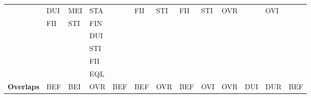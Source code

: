 \documentclass[11pt]{report}
\newenvironment{vvarmargin}[2]
{
  \begin{list}{}
  {
    \setlength{\topsep}{0pt}
    \setlength{\leftmargin}{0pt}
    \setlength{\rightmargin}{0pt}
    \setlength{\listparindent}{\parindent}
    \setlength{\itemindent}{\parindent}
    \setlength{\parsep}{0pt plus 1pt}
    \addtolength{\leftmargin}{#1}\addtolength{\rightmargin}{#2}
  }
  \item
}
{
  \end{list}
}
\begin{document}
\begin{table}[p]
\begin{vvarmargin}{-4cm}{-4cm}
\begin{center}
\begin{tabular}[t]{|r|l|l|l|l|l|l|l|l|l|l|l|l|}
                                          & DUI                     & MEI                     & STA                     &                         & FII                     & STI                     & FII                     & STI                     & OVR                     &                         & OVI                     &                         \\
                                          & FII                     & STI                     & FIN                     &                         &                         &                         &                         &                         &                         &                         &                         &                         \\
                                          &                         &                         & DUI                     &                         &                         &                         &                         &                         &                         &                         &                         &                         \\
                                          &                         &                         & STI                     &                         &                         &                         &                         &                         &                         &                         &                         &                         \\
                                          &                         &                         & FII                     &                         &                         &                         &                         &                         &                         &                         &                         &                         \\
                                          &                         &                         & EQL                     &                         &                         &                         &                         &                         &                         &                         &                         &                         \\
                  \hline
                  \textbf{Overlaps}       & BEF                     & BEI                     & OVR                     & BEF                     & BEF                     & OVR                     & BEF                     & OVI                     & OVR                     & DUI                     & DUR                     & BEF                     \\

\end{tabular}
\end{center}
\end{vvarmargin}
\end{table}
\end{document}
